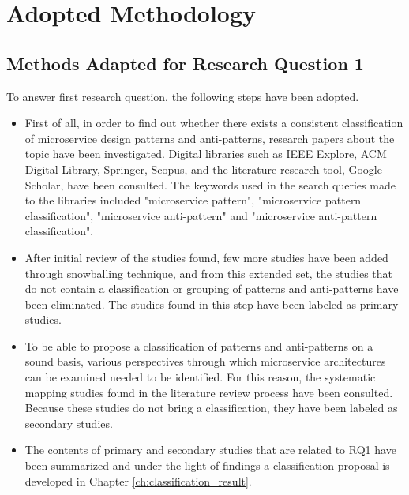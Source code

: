 \documentclass{Configuration_Files/PoliMi3i_thesis}
\begin{document}
\section{Adopted Methodology}
\label{sec:adopted_method}

\subsection{Methods Adapted for Research Question 1}
\label{subsec:adopted_method_RQ1}

To answer first research question, the following steps have been adopted.

\begin{itemize}
    \item First of all, in order to find out whether there exists a consistent classification of microservice design patterns and anti-patterns, research papers about the topic have been investigated.
    Digital libraries such as IEEE Explore, ACM Digital Library, Springer, Scopus, and the literature research tool, Google Scholar, have been consulted.
    The keywords used in the search queries made to the libraries included "microservice pattern", "microservice pattern classification", "microservice anti-pattern" and "microservice anti-pattern classification".

    \item After initial review of the studies found, few more studies have been added through snowballing technique, and from this extended set, the studies that do not contain a classification or grouping of patterns and anti-patterns have been eliminated.
    The studies found in this step have been labeled as primary studies.
    
    \item To be able to propose a classification of patterns and anti-patterns on a sound basis, various perspectives through which microservice architectures can be examined needed to be identified.
    For this reason, the systematic mapping studies found in the literature review process have been consulted.
    Because these studies do not bring a classification, they have been labeled as secondary studies.
    
    \item The contents of primary and secondary studies that are related to RQ1 have been summarized and under the light of findings a classification proposal is developed in Chapter \ref{ch:classification_result}.
\end{itemize}
\end{document}
